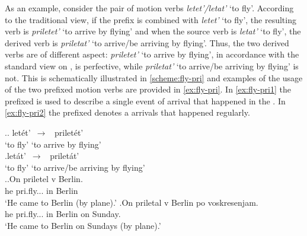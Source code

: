 
As an example, consider the pair of motion verbs \textit{letet'/letat'} `to fly'. According to the traditional view, if the prefix  is combined with \textit{letet'}\textsubscript{\DET} `to fly', the resulting verb is \textit{priletet'}\textsuperscript{\PF} `to arrive by flying' and when the source verb is \textit{letat'}\textsubscript{\INDET} `to fly', the derived verb is \textit{priletat'}\textsuperscript{\IPF} `to arrive/be arriving by flying'. Thus, the two derived verbs are of different aspect: \textit{priletet'} `to arrive by flying', in accordance with the standard view on , is perfective, while \textit{priletat'} `to arrive/be arriving by flying' is not. This is schematically illustrated in \ref{scheme:fly-pri} and examples of the usage of the two prefixed motion verbs are provided in \ref{ex:fly-pri}. In \ref{ex:fly-pri1} the prefixed  is used to describe a single event of arrival that happened in the . In \ref{ex:fly-pri2} the prefixed  denotes a  arrivals that happened regularly.

\ex.\label{scheme:fly-pri}\ag. let\'{e}t'\textsuperscript{\IPF}~$\to$~ prilet\'{e}t'\textsuperscript{\PF}\\
{`to fly'} {`to arrive by flying'}\\
\bg.let\'{a}t'\textsuperscript{\IPF}~$\to$~ prilet\'{a}t'\textsuperscript{\IPF}\\
{`to fly'} {`to arrive/be arriving by flying'}\\

\ex.\label{ex:fly-pri}\ag.\label{ex:fly-pri1}On priletel\textsuperscript{\PF} v Berlin.\\
he pri.fly... in Berlin\\
\trans `He came to Berlin (by plane).'
\bg.\label{ex:fly-pri2}On priletal\textsuperscript{\IPF} v Berlin po voskresenjam.\\
he pri.fly... in Berlin on Sunday.\\
\trans `He came to Berlin on Sundays (by plane).'


